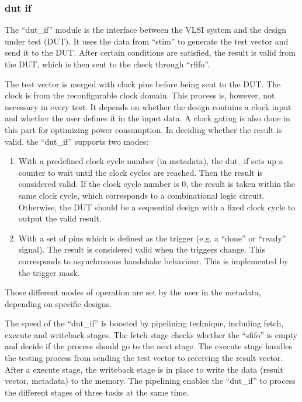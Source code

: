\subsubsection{dut if}

The ``dut\_if'' module is the interface between the VLSI system and the design under test (DUT). It uses the data from ``stim'' to generate the test vector and send it to the DUT. After certain conditions are satisfied, the result is valid from the DUT, which is then sent to the check through ``rfifo''.

The test vector is merged with clock pins before being sent to the DUT. The clock is from the reconfigurable clock domain. This process is, however, not necessary in every test. It depends on whether the design contains a clock input and whether the user defines it in the input data. A clock gating is also done in this part for optimizing power consumption.
In deciding whether the result is valid, the ``dut\_if'' supports two modes:

\begin{enumerate}
 \item With a predefined clock cycle number (in metadata), the dut\_if sets up a counter to wait until the clock cycles are reached. Then the result is considered valid. If the clock cycle number is 0, the result is taken within the same clock cycle, which corresponds to a combinational logic circuit. Otherwise, the DUT should be a sequential design with a fixed clock cycle to output the valid result.

 \item With a set of pins which is defined as the trigger (e.g. a ``done'' or ``ready'' signal). The result is considered valid when the triggers change. This corresponds to asynchronous handshake behaviour. This is implemented by the trigger mask.
\end{enumerate}

Those different modes of operation are set by the user in the metadata, depending on specific designs.

The speed of the ``dut\_if'' is boosted by pipelining technique, including fetch, execute and writeback stages. The fetch stage checks whether the ``sfifo'' is empty and decide if the process should go to the next stage. The execute stage handles the testing process from sending the test vector to receiving the result vector. After a execute stage, the writeback stage is in place to write the data (result vector, metadata) to the memory. The pipelining enables the ``dut\_if'' to process the different stages of three tasks at the same time.

